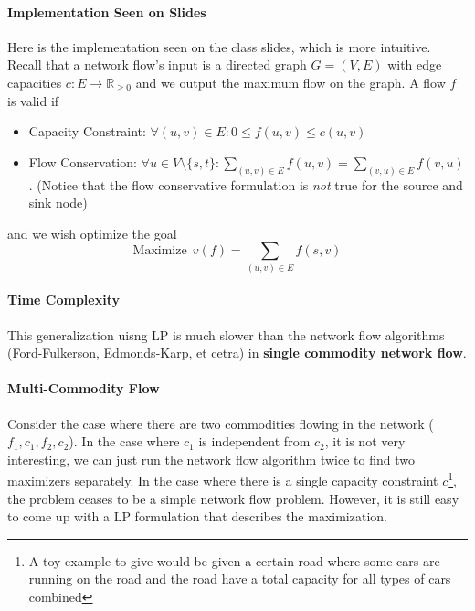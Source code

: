 \documentclass[10pt]{article}
\newcommand{\real}{\mathbb{R}}
\begin{document}
\paragraph{Implementation Seen on Slides} Here is the implementation seen on the class slides, which is more intuitive. Recall that a network flow's input is a directed graph $G = (V,E)$ with edge capacities $c:E\rightarrow \real_{\geq 0}$ and we output the maximum flow on the graph. A flow $f$ is valid if
\begin{itemize}
    \item Capacity Constraint: $\forall (u,v) \in E: 0 \leq f(u,v) \leq c(u,v)$
    \item Flow Conservation: $\forall u\in V\setminus\{s,t\}: \sum_{(u,v)\in E}f(u,v) = \sum_{(v,u)\in E}f(v,u)$. (Notice that the flow conservative formulation is \textit{not} true for the source and sink node)
\end{itemize}
and we wish optimize the goal
\begin{equation*}
    \text{Maximize}~~v(f) = \sum_{(u,v)\in E} f(s,v)
\end{equation*}

\paragraph{Time Complexity} This generalization uisng LP is much slower than the network flow algorithms (Ford-Fulkerson, Edmonds-Karp, et cetra) in \textbf{single commodity network flow}. 

\paragraph{Multi-Commodity Flow} Consider the case where there are two commodities flowing in the network ($f_1, c_1, f_2, c_2$). In the case where $c_1$ is independent from $c_2$, it is not very interesting, we can just run the network flow algorithm twice to find two maximizers separately. In the case where there is a single capacity constraint $c$\footnote{A toy example to give would be given a certain road where some cars are running on the road and the road have a total capacity for all types of cars combined}, the problem ceases to be a simple network flow problem. However, it is still easy to come up with a LP formulation that describes the maximization. 
\end{document}
